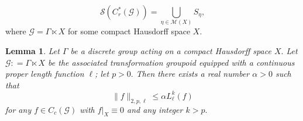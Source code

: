 \documentclass[a4paper,11pt,reqno]{amsart}
\theoremstyle{plain}
\newtheorem{lem}[thm]{Lemma}
\theoremstyle{named}
\numberwithin{equation}{section}
\begin{document}
		\begin{displaymath}
				\mathcal{S}(C^{\ast}_{r}(\mathcal G))=\bigcup\limits_{\eta\in\mathcal{M}(X)}S_{\eta},
			\end{displaymath}
			where $\mathcal G=\Gamma\ltimes X$ for some compact Hausdorff space $X$.
			
			\begin{lem}\label{lem4}
				Let $\Gamma$ be a discrete group acting on a compact Hausdorff space $X.$ Let $\mathcal G : = \Gamma \ltimes X$ be the associated transformation groupoid equipped with a continuous proper length function $\ell$; let $p > 0.$ Then there exists a real number $\alpha > 0$ such that
				$$\|f\|_{2, p, \ell} \leq \alpha L_{\ell}^k (f)$$ \vspace{2mm}
				for any  $f \in C_c (\mathcal G)$ with $f \rvert_{X} \equiv 0$ and any integer $k > p.$
			\end{lem}
			
\end{document}
